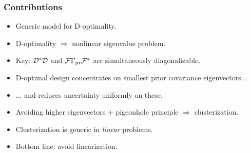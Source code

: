 \documentclass{beamer}
\begin{document}
\begin{frame}
  \frametitle{Contributions}
  \begin{itemize}
  \item <1-> Generic model for D-optimality.
  \item <2-> D-optimality \( \Longrightarrow \) nonlinear eigenvalue problem.%
  \item <3-> Key: $\mathcal{D}^*\mathcal{D}$ and \(\mathcal{F} \Gamma_{\textup{pr}}\mathcal{F}^*\) are
    simultaneously diagonalizable.
  \item <4-> D-optimal design concentrates on smallest prior covariance eigenvectors...
  \item <5-> ... and reduces uncertainty uniformly on these.
  \item <6-> Avoiding higher eigenvectors + pigeonhole principle
    $\Rightarrow$ clusterization.
  \item <7-> Clusterization is generic in \emph{linear} problems.
  \item <8-> Bottom line: avoid linearization. %
  \end{itemize}
\end{frame}
\end{document}
